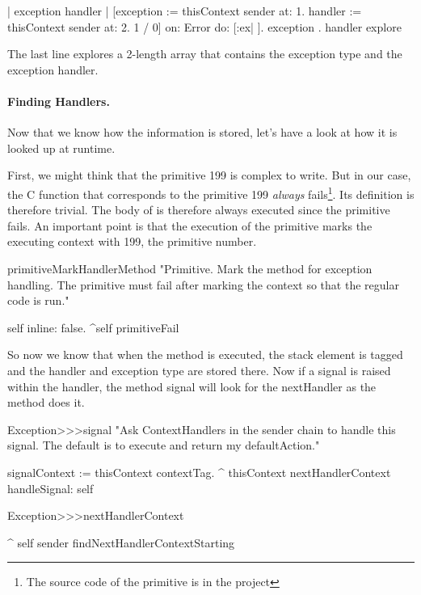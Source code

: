 \documentclass[a4paper,10pt,twoside]{book}
\begin{document}
\begin{code}{}
| exception handler | 
[exception := thisContext sender at: 1. 
 handler := thisContext sender at: 2. 
 1 / 0] 
on: Error 
do: [:ex| ]. 
{ exception . handler } explore
\end{code}

The last line explores a 2-length array that contains the exception type and the exception handler. 

\paragraph{Finding Handlers.}
Now that we know how the information is stored, let's have a look at how it is looked up at runtime. 

First, we might think that the primitive 199 is complex to write. But in our case, the C function that corresponds to the primitive 199 \emph{always} fails\footnote{The source code of the primitive is  in the  \sqsrc project}. Its definition is therefore trivial. The body of  is therefore always executed since the primitive fails. An important point is that the execution of the primitive marks the executing context with 199, the primitive number. 

\begin{code}{}
primitiveMarkHandlerMethod
     "Primitive. Mark the method for exception handling. The primitive must fail after
     marking the context so that the regular code is run."
     
     self inline: false.
    ^self primitiveFail
\end{code}

So now we know that when the method  is executed, the stack element is tagged and the handler and exception type 
are stored there. Now if a signal is raised within the handler, the method signal will look for the nextHandler as the method 
does it.

\begin{code}{}
Exception>>>signal
	"Ask ContextHandlers in the sender chain to handle this signal.
	The default is to execute and return my defaultAction."

	signalContext := thisContext contextTag.
	^ thisContext nextHandlerContext handleSignal: self
\end{code}

\begin{code}{}
Exception>>>nextHandlerContext

	^ self sender findNextHandlerContextStarting
\end{code}
\end{document}
